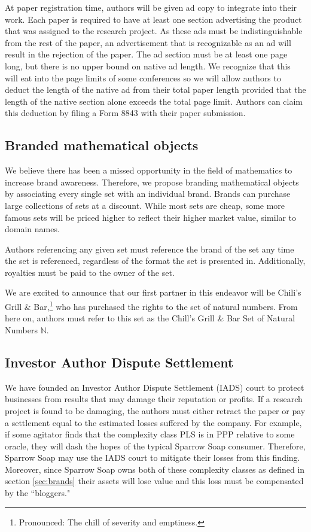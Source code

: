 At paper registration time, authors will be given ad copy to integrate into
their work.
Each paper is required to have at least one section advertising the product
that was assigned to the research project.
As these ads must be indistinguishable from the rest of the paper, an
advertisement that is recognizable as an ad will result in the rejection of the
paper.
The ad section must be at least one page long, but there is no upper bound on
native ad length.
We recognize that this will eat into the page limits of some conferences so we
will allow authors to deduct the length of the native ad from their total paper
length provided that the length of the native section alone exceeds the total
page limit.
Authors can claim this deduction by filing a Form 8843 with their paper
submission.

\subsection{Branded mathematical objects}
\label{sec:brands}
We believe there has been a missed opportunity in the field of mathematics to
increase brand awareness.
Therefore, we propose branding mathematical objects by associating every single
set with an individual brand.
Brands can purchase large collections of sets at a discount.
While most sets are cheap, some more famous sets will be priced higher to
reflect their higher market value, similar to domain names.

Authors referencing any given set must reference the brand of the set any time
the set is referenced, regardless of the format the set is presented  in.
Additionally, royalties must be paid to the owner of the set.

We are excited to announce that our first partner in this endeavor will be
Chili's Grill \& Bar,\footnote{Pronounced:  The chill of severity and emptiness.} who has purchased the rights to the set of natural
numbers.
From here on, authors must refer to this set as the Chill's Grill \& Bar Set of
Natural Numbers \(\mathbb{N}\).

\subsection{Investor Author Dispute Settlement}
We have founded an Investor Author Dispute Settlement (IADS) court to protect
businesses from results that may damage their reputation or profits.
If a research project is found to be damaging, the authors must either retract
the paper or pay a settlement equal to the estimated losses suffered by the
company.
For example, if some agitator finds that the complexity class PLS is in PPP
relative to some oracle, they will dash the hopes of the typical Sparrow Soap
consumer.
Therefore, Sparrow Soap may use the IADS court to mitigate their losses from
this finding.
Moreover, since Sparrow Soap owns both of these complexity classes as defined
in section \autoref{sec:brands} their assets will lose value and
this loss must be compensated by the ``bloggers."

